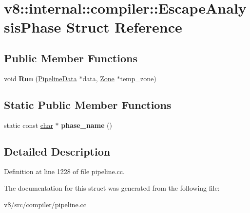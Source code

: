 \hypertarget{structv8_1_1internal_1_1compiler_1_1EscapeAnalysisPhase}{}\section{v8\+:\+:internal\+:\+:compiler\+:\+:Escape\+Analysis\+Phase Struct Reference}
\label{structv8_1_1internal_1_1compiler_1_1EscapeAnalysisPhase}
\subsection*{Public Member Functions}
\begin{DoxyCompactItemize}
\item 
\mbox{\label{structv8_1_1internal_1_1compiler_1_1EscapeAnalysisPhase_ae858efbea3b7cd856c2788428dcc98c9}} 
void {\bfseries Run} (\mbox{\hyperlink{classv8_1_1internal_1_1compiler_1_1PipelineData}{Pipeline\+Data}} $\ast$data, \mbox{\hyperlink{classv8_1_1internal_1_1Zone}{Zone}} $\ast$temp\+\_\+zone)
\end{DoxyCompactItemize}
\subsection*{Static Public Member Functions}
\begin{DoxyCompactItemize}
\item 
\mbox{\label{structv8_1_1internal_1_1compiler_1_1EscapeAnalysisPhase_a4a9d396329e6d5a939fb3bb49709cb5e}} 
static const \mbox{\hyperlink{classchar}{char}} $\ast$ {\bfseries phase\+\_\+name} ()
\end{DoxyCompactItemize}


\subsection{Detailed Description}


Definition at line 1228 of file pipeline.\+cc.



The documentation for this struct was generated from the following file\+:\begin{DoxyCompactItemize}
\item 
v8/src/compiler/pipeline.\+cc\end{DoxyCompactItemize}
